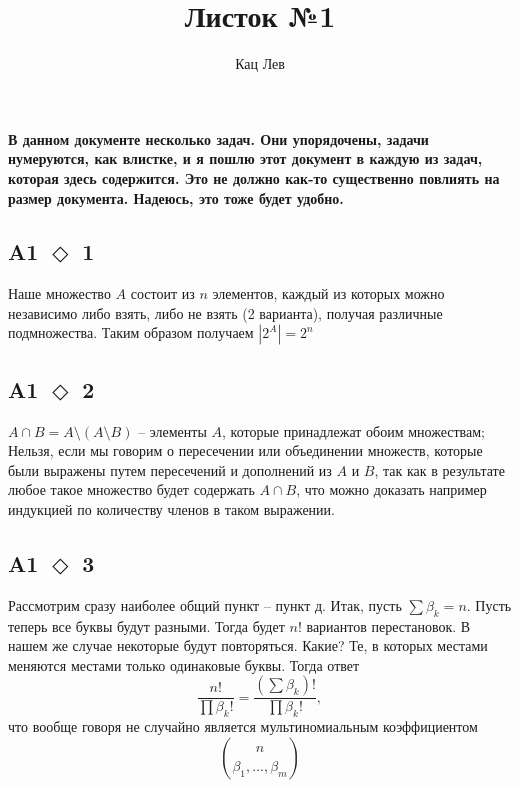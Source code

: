 \documentclass[a4paper]{article}
\title{Листок №1}
\author{Кац Лев}
\begin{document}
  \maketitle

  \textbf{В данном документе несколько задач. Они упорядочены, задачи нумеруются, как влистке, и я пошлю этот документ в каждую из задач, которая здесь содержится. Это не должно как-то существенно повлиять на размер документа. Надеюсь, это тоже будет удобно.}

  \subsection*{A1 $\Diamond$ 1}
  Наше множество $A$ состоит из $n$ элементов, каждый из которых можно независимо либо взять, либо не взять (2 варианта), получая различные подмножества. Таким образом получаем $|2^A| = 2^n$

  \subsection*{A1 $\Diamond$ 2}
  $A \cap B = A \setminus (A \setminus B)$ -- элементы $A$, которые принадлежат обоим множествам; Нельзя, если мы говорим о пересечении или объединении множеств, которые были выражены путем пересечений и дополнений из $A$ и $B$, так как в результате любое такое множество будет содержать $A \cap B$, что можно доказать например индукцией по количеству членов в таком выражении.

  \subsection*{A1 $\Diamond$ 3}
  Рассмотрим сразу наиболее общий пункт -- пункт д. Итак, пусть $\sum \beta_k = n$. Пусть теперь все буквы будут разными. Тогда будет $n!$ вариантов перестановок. В нашем же случае некоторые будут повторяться. Какие? Те, в которых местами меняются местами только одинаковые буквы. Тогда ответ
  $$\frac{n!}{\prod \beta_k!} = \frac{(\sum \beta_k)!}{\prod \beta_k!},$$
  что вообще говоря не случайно является мультиномиальным коэффициентом
  $${n}\choose{\beta_1, ..., \beta_m}$$
\end{document}
